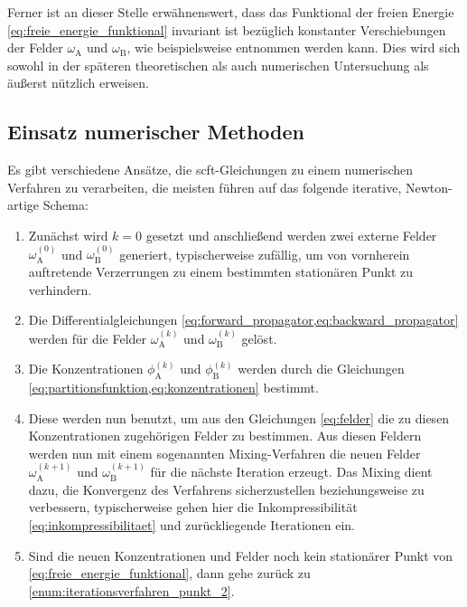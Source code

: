 Ferner ist an dieser Stelle erwähnenswert, dass das Funktional der freien Energie \cref{eq:freie_energie_funktional} invariant ist bezüglich konstanter Verschiebungen der Felder $\omega_{\mathrm{A}}$ und $\omega_{\mathrm{B}}$, wie beispielsweise \cite{Ceniceros:2006is} entnommen werden kann.
Dies wird sich sowohl in der späteren theoretischen als auch numerischen Untersuchung als äußerst nützlich erweisen.


\subsection*{Einsatz numerischer Methoden} %
Es gibt verschiedene Ansätze, die \ac{scft}-Gleichungen zu einem numerischen Verfahren zu verarbeiten, die meisten führen auf das folgende iterative, Newton-artige Schema:
\begin{enumerate}[label={\itshape\roman*.},ref={\itshape\roman*}]
    \item Zunächst wird $k = 0$ gesetzt und anschließend werden zwei externe Felder $\omega^{(0)}_{\mathrm{A}}$ und $\omega^{(0)}_{\mathrm{B}}$ generiert, typischerweise zufällig, um von vornherein auftretende Verzerrungen zu einem bestimmten stationären Punkt zu verhindern.
    \item\label{enum:iterationsverfahren_punkt_2} Die Differentialgleichungen \cref{eq:forward_propagator,eq:backward_propagator} werden für die Felder $\omega^{(k)}_{\mathrm{A}}$ und $\omega^{(k)}_{\mathrm{B}}$ gelöst.
    \item Die Konzentrationen $\phi^{(k)}_{\mathrm{A}}$ und $\phi^{(k)}_{\mathrm{B}}$ werden durch die Gleichungen \cref{eq:partitionsfunktion,eq:konzentrationen} bestimmt.
    \item Diese werden nun benutzt, um aus den Gleichungen \cref{eq:felder} die zu diesen Konzentrationen zugehörigen Felder zu bestimmen.
    Aus diesen Feldern werden nun mit einem sogenannten Mixing-Verfahren die neuen Felder $\omega^{(k+1)}_{\mathrm{A}}$ und $\omega^{(k+1)}_{\mathrm{B}}$ für die nächste Iteration erzeugt.
    Das Mixing dient dazu, die Konvergenz des Verfahrens sicherzustellen beziehungsweise zu verbessern, typischerweise gehen hier die Inkompressibilität \cref{eq:inkompressibilitaet} und zurückliegende Iterationen ein.
    \item Sind die neuen Konzentrationen und Felder noch kein stationärer Punkt von \cref{eq:freie_energie_funktional}, dann gehe zurück zu \cref{enum:iterationsverfahren_punkt_2}.
\end{enumerate}

